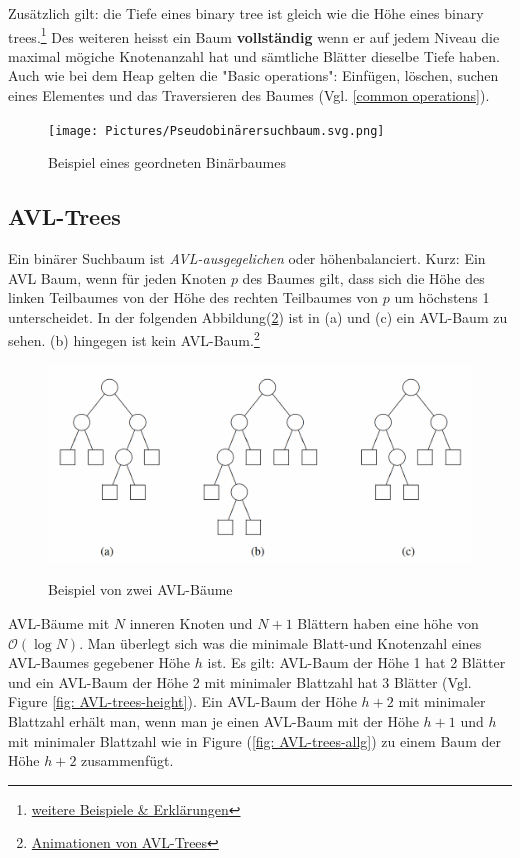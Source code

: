\documentclass[a4paper]{article}
\begin{document}
Zusätzlich gilt: die Tiefe eines binary tree ist gleich wie die Höhe eines binary trees.\footnote{\href{https://www.baeldung.com/cs/binary-tree-height}{weitere Beispiele \& Erklärungen}}
Des weiteren heisst ein Baum \textbf{vollständig} wenn er auf jedem Niveau die maximal mögiche Knotenanzahl hat und sämtliche Blätter dieselbe Tiefe haben. 
Auch wie bei dem Heap gelten die "Basic operations": Einfügen, löschen, suchen eines Elementes und das Traversieren des Baumes (Vgl. \ref{common operations}).

\begin{figure}[h] 
\caption{Beispiel eines geordneten Binärbaumes}
\centering
\texttt{[image: Pictures/Pseudobinärersuchbaum.svg.png]}
\label{fig: binarytree}
\end{figure}




\subsection{AVL-Trees}
Ein binärer Suchbaum ist \textit{AVL-ausgegelichen} oder höhenbalanciert. Kurz: Ein AVL Baum, wenn für jeden Knoten $p$ des Baumes gilt, dass sich die Höhe des linken Teilbaumes von der Höhe des rechten Teilbaumes von $p$ um höchstens 1 unterscheidet. In der folgenden Abbildung(\ref{fig: AVL-trees}) ist in (a)  und (c) ein AVL-Baum zu sehen. (b) hingegen ist kein AVL-Baum.\footnote{\href{https://www.cs.usfca.edu/~galles/visualization/AVLtree.html}{Animationen von AVL-Trees}}

\begin{figure}[h] 
\caption{Beispiel von zwei AVL-Bäume}
\centering
\includegraphics[scale= 0.5]{Pictures/AVL-trees.png}
\label{fig: AVL-trees}
\end{figure}

AVL-Bäume mit $N$ inneren Knoten und $N+1$ Blättern haben eine höhe von $\mathcal{O}(\log N)$. Man überlegt sich was die minimale Blatt-und Knotenzahl eines AVL-Baumes gegebener Höhe $h$ ist. Es gilt: AVL-Baum der Höhe 1 hat 2 Blätter und ein AVL-Baum der Höhe 2 mit minimaler Blattzahl hat 3 Blätter (Vgl. Figure \ref{fig: AVL-trees-height}). Ein AVL-Baum der Höhe $h+2$ mit minimaler Blattzahl erhält man, wenn man je einen AVL-Baum mit der Höhe $h+1$ und $h$ mit minimaler Blattzahl wie in Figure (\ref{fig: AVL-trees-allg}) zu einem Baum der Höhe $h+2$ zusammenfügt.
\end{document}

